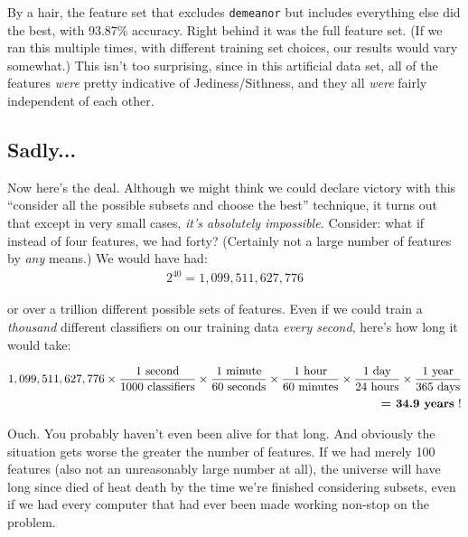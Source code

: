 By a hair, the feature set that excludes \texttt{demeanor} but includes
everything else did the best, with 93.87\% accuracy. Right behind it was the
full feature set. (If we ran this multiple times, with different training set
choices, our results would vary somewhat.) This isn't too surprising, since in
this artificial data set, all of the features \textit{were} pretty indicative
of Jediness/Sithness, and they all \textit{were} fairly independent of each
other.

\subsection{Sadly...}

Now here's the deal. Although we might think we could declare victory with
this ``consider all the possible subsets and choose the best'' technique, it
turns out that except in very small cases, \textit{it's absolutely
impossible.} Consider: what if instead of four features, we had forty?
(Certainly not a large number of features by \textit{any} means.) We would
have had:
\begin{align*}
2^{40} = 1,099,511,627,776
\end{align*}
\vspace{-.2in}

or over a trillion different possible sets of features. Even if we could train
a \textit{thousand} different classifiers on our training data \textit{every
second}, here's how long it would take:

\vspace{-.2in}
\scriptsize
\begin{align*}
1,099,511,627,776 \times 
    \frac{1\ \textrm{second}}{1000\ \textrm{classifiers}} \times
    \frac{1\ \textrm{minute}}{60\ \textrm{seconds}} \times
    \frac{1\ \textrm{hour}}{60\ \textrm{minutes}} \times
    \frac{1\ \textrm{day}}{24\ \textrm{hours}} \times
    \frac{1\ \textrm{year}}{365\ \textrm{days}}\\
{\normalsize \textrm{\textbf{= 34.9\ years}\ !}}
\end{align*}
\normalsize
\smallskip

Ouch. You probably haven't even been alive for that long. And obviously the
situation gets worse the greater the number of features. If we had merely 100
features (also not an unreasonably large number at all), the universe will
have long since died of heat death by the time we're finished considering
subsets, even if we had every computer that had ever been made working
non-stop on the problem.

